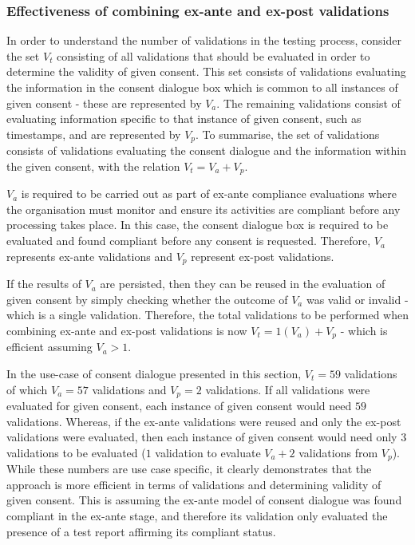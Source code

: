 \subsubsection*{Effectiveness of combining ex-ante and ex-post validations}
In order to understand the number of validations in the testing process, consider the set $V_{t}$ consisting of all validations that should be evaluated in order to determine the validity of given consent. This set consists of validations evaluating the information in the consent dialogue box which is common to all instances of given consent - these are represented by $V_{a}$. The remaining validations consist of evaluating information specific to that instance of given consent, such as timestamps, and are represented by $V_{p}$. 
To summarise, the set of validations consists of validations evaluating the consent dialogue and the information within the given consent, with the relation $V_{t} = V_{a} + V_{p}$.

$V_{a}$ is required to be carried out as part of ex-ante compliance evaluations where the organisation must monitor and ensure its activities are compliant before any processing takes place. In this case, the consent dialogue box is required to be evaluated and found compliant before any consent is requested. Therefore, $V_{a}$ represents ex-ante validations and $V_{p}$ represent ex-post validations.

If the results of $V_{a}$ are persisted, then they can be reused in the evaluation of given consent by simply checking whether the outcome of $V_{a}$ was valid or invalid - which is a single validation. Therefore, the total validations to be performed when combining ex-ante and ex-post validations is now $V_{t} = 1(V_{a}) + V_{p}$ - which is efficient assuming $V_{a} > 1$.

In the use-case of consent dialogue presented in this section, $V_{t}=59$ validations of which $V_{a}=57$ validations and $V_{p}=2$ validations. If all validations were evaluated for given consent, each instance of given consent would need $59$ validations. Whereas, if the ex-ante validations were reused and only the ex-post validations were evaluated, then each instance of given consent would need only $3$ validations to be evaluated ($1$ validation to evaluate $V_{a} + 2$ validations from $V_{p}$). While these numbers are use case specific, it clearly demonstrates that the approach is more efficient in terms of validations and determining validity of given consent. This is assuming the ex-ante model of consent dialogue was found compliant in the ex-ante stage, and therefore its validation only evaluated the presence of a test report affirming its compliant status.

